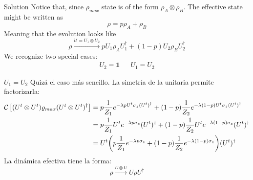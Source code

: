 \documentclass{cubeamer}
\newcommand{\mcU}{\mathcal{U}}
\newcommand{\mcC}{\mathcal{C}}
\newcommand{\Id}{\mathds{1}}%
\newcommand{\CG}[1]{\mcC\left[#1\right]}
\begin{document}
\begin{frame}{Solution}
    Notice that, since $\rho_{max}$ state is of the form $\rho_{A}\otimes\rho_{B}$. The effective state might be written as 
    \begin{equation*}
        \rho=p\rho_{A}+\rho_{B}
    \end{equation*}
    Meaning that the evolution looks like
    \begin{equation*}
        \rho\xrightarrow{\mcU=U_{1}\otimes U_{2}} pU_{1}\rho_{A}U_{1}^{\dag}+(1-p)U_{2}\rho_{B}U_{2}^{\dag}
    \end{equation*}
    We recognize two special cases:
    \begin{align*}
        U_{2}=\Id&&U_{1}=U_{2}
    \end{align*}
\end{frame}

\begin{frame}{$U_{1}=U_{2}$}
    Quizá el caso más sencillo. La simetría de la unitaria permite factorizarla:
    \begin{align*}
    \CG{(U^{t}\otimes U^{t})\varrho_{max}(U^{t}\otimes U^{t})^{\dag}}&=p\frac{1}{Z_{1}}e^{-\lambda p U^{t}\sigma_{z}(U^t)^{\dag}}+(1-p)\frac{1}{Z_{2}}e^{-\lambda (1-p)U^{t}\sigma_{z}(U^t)^{\dag}}\\
    &=p\frac{1}{Z_{1}}U^{t}e^{-\lambda p \sigma_{z}}(U^t)^{\dag}+(1-p)\frac{1}{Z_{2}}U^{t}e^{-\lambda (1-p)\sigma_{z}}(U^t)^{\dag}\\
    &=U^{t}\qty(p\frac{1}{Z_{1}}e^{-\lambda p \sigma_{z}}+(1-p)\frac{1}{Z_{2}}e^{-\lambda (1-p)\sigma_{z}})(U^t)^{\dag}\\
    \end{align*}
    La dinámica efectiva tiene la forma:
    \begin{equation}
        \rho\xrightarrow{U\otimes U}U\rho U^{\dagger}
    \end{equation}
\end{frame}
\end{document}
